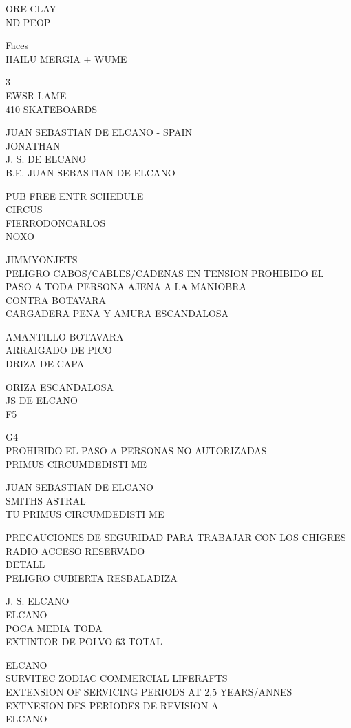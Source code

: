\documentclass[10pt,letterpaper]{article}
\begin{document}
ORE CLAY\\
ND PEOP

Faces\\
HAILU MERGIA + WUME

3\\
EWSR LAME\\
410 SKATEBOARDS

JUAN SEBASTIAN DE ELCANO {-} SPAIN\\
JONATHAN\\
J. S. DE ELCANO\\
B.E. JUAN SEBASTIAN DE ELCANO

PUB FREE ENTR SCHEDULE\\
CIRCUS\\
FIERRODONCARLOS\\
NOXO

JIMMYONJETS\\
PELIGRO CABOS/CABLES/CADENAS EN TENSION PROHIBIDO EL PASO A TODA PERSONA AJENA A LA MANIOBRA\\
CONTRA BOTAVARA\\
CARGADERA PENA Y AMURA ESCANDALOSA

AMANTILLO BOTAVARA\\
ARRAIGADO DE PICO\\
DRIZA DE CAPA

ORIZA ESCANDALOSA\\
JS DE ELCANO\\
F5

G4\\
PROHIBIDO EL PASO A PERSONAS NO AUTORIZADAS\\
PRIMUS CIRCUMDEDISTI ME

JUAN SEBASTIAN DE ELCANO\\
SMITHS ASTRAL\\
TU PRIMUS CIRCUMDEDISTI ME

PRECAUCIONES DE SEGURIDAD PARA TRABAJAR CON LOS CHIGRES\\
RADIO ACCESO RESERVADO\\
DETALL\\
PELIGRO CUBIERTA RESBALADIZA

J. S. ELCANO\\
ELCANO\\
POCA MEDIA TODA\\
EXTINTOR DE POLVO 63 TOTAL

ELCANO\\
SURVITEC ZODIAC COMMERCIAL LIFERAFTS\\
EXTENSION OF SERVICING PERIODS AT 2,5 YEARS/ANNES EXTNESION DES PERIODES DE REVISION A\\
ELCANO
\end{document}
